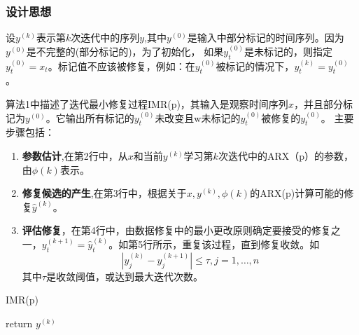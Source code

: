 \documentclass[12pt,a4paper]{article}
\begin{document}
\subsubsection{设计思想}
设$y^{(k)}$表示第$k$次迭代中的序列$y$,其中$y^{(0)}$是输入中部分标记的时间序列。因为$y^{(0)}$是不完整的(部分标记的)，为了初始化，
如果$y_{t}^{(0)}$是未标记的，则指定$y_{t}^{(0)} = x_t$。标记值不应该被修复，例如：在$y_{t}^{(0)}$被标记的情况下，$y_{t}^{(k)}=y_{t}^{(0)}$。
\par
算法1中描述了迭代最小修复过程IMR(p)，其输入是观察时间序列$x$，并且部分标记为$y^{(0)}$。它输出所有标记的$y_{t}^{(0)}$未改变且w未标记的$y_{t}^{(0)}$被修复的$y_{t}^{(0)}$。
主要步骤包括：
\begin{enumerate}
    \item \textbf{参数估计},在第2行中，从$x$和当前$y^{(k)}$学习第$k$次迭代中的ARX（p）的参数，由$\phi(k)$表示。
    \item \textbf{修复候选的产生},在第3行中，根据关于$x,y^{(k)},\phi(k)$的ARX(p)计算可能的修复$\hat{y}^{(k)}$。
    \item \textbf{评估修复}，在第4行中，由数据修复中的最小更改原则确定要接受的修复之一，$y_{t}^{(k+1)}=\hat{y}_{t}^{(k)}$。如第5行所示，重复该过程，直到修复收敛。如
\begin{equation}
\left|y_{j}^{(k)}-y_{j}^{(k+1)}\right| \leq \tau, j=1, \ldots, n
\end{equation}
其中$\tau$是收敛阈值，或达到最大迭代次数。
\end{enumerate}

\begin{algorithm}[h]
\caption{IMR(p)}
\LinesNumbered %
return $y^{(k)}$
\end{algorithm}
\end{document}
